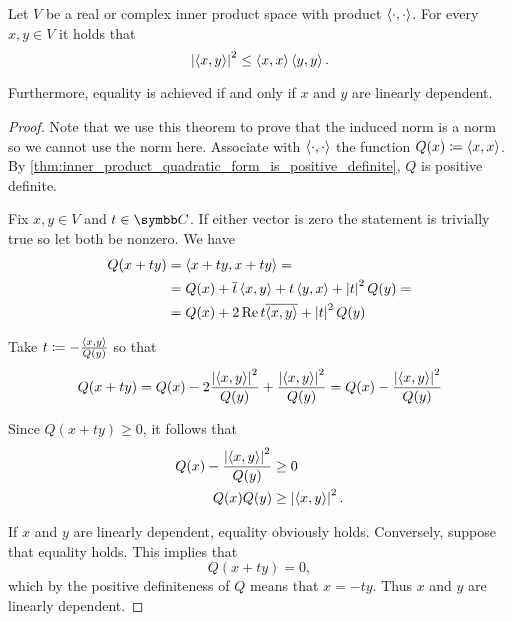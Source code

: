 \begin{theorem}\label{thm:cauchy_bunyakovsky_schwarz_inequality}
  Let \( V \) be a real or complex inner product space with product \( \left\langle \cdot, \cdot \right\rangle \). For every \( x, y \in V \) it holds that
  \begin{equation}\label{thm:cauchy_bunyakovsky_schwarz_inequality/inequality}
    {\left\vert \left\langle x, y \right\rangle \right\vert}^2 \leq \left\langle x, x \right\rangle \left\langle y, y \right\rangle.
  \end{equation}

  Furthermore, equality is achieved if and only if \( x \) and \( y \) are linearly dependent.
\end{theorem}
\begin{proof}
  Note that we use this theorem to prove that the induced norm is a norm so we cannot use the norm here. Associate with \( \left\langle \cdot, \cdot \right\rangle \) the function \( Q(x) \coloneqq \left\langle x, x \right\rangle \). By \cref{thm:inner_product_quadratic_form_is_positive_definite}, \( Q \) is positive definite.

  Fix \( x, y \in V \) and \( t \in \C \). If either vector is zero the statement is trivially true so let both be nonzero. We have
  \begin{align*}
    Q(x + ty)
    &=
    \left\langle x + ty, x + ty \right\rangle
    = \\ &=
    Q(x) + \overline{t} \left\langle x, y \right\rangle + t \left\langle y, x \right\rangle + \left\vert t \right\vert^2 Q(y)
    = \\ &=
    Q(x) + 2\operatorname{Re} t \overline{\left\langle x, y \right\rangle} + \left\vert t \right\vert^2 Q(y)
  \end{align*}

  Take \( t \coloneqq - \frac {\left\langle x, y \right\rangle} {Q(y)} \) so that
  \begin{equation*}
    Q(x + ty)
    =
    Q(x) - 2 \frac {\left\vert \left\langle x, y \right\rangle \right\vert^2} {Q(y)} + \frac {\left\vert \left\langle x, y \right\rangle \right\vert^2} {Q(y)}
    =
    Q(x) - \frac {\left\vert \left\langle x, y \right\rangle \right\vert^2} {Q(y)}
  \end{equation*}

  Since \( Q(x + ty) \geq 0 \), it follows that
  \begin{align*}
    Q(x) - \frac {\left\vert \left\langle x, y \right\rangle \right\vert^2} {Q(y)} &\geq 0 \\
    Q(x) Q(y) &\geq \left\vert \left\langle x, y \right\rangle \right\vert^2.
  \end{align*}

  If \( x \) and \( y \) are linearly dependent, equality obviously holds. Conversely, suppose that equality holds. This implies that
  \begin{equation*}
    Q(x + ty) = 0,
  \end{equation*}
  which by the positive definiteness of \( Q \) means that \( x = -ty \). Thus \( x \) and \( y \) are linearly dependent.
\end{proof}


